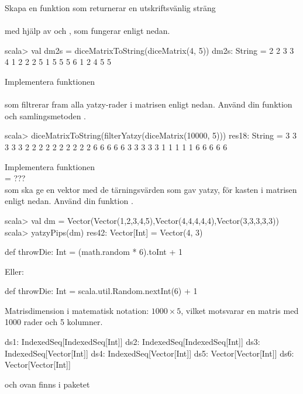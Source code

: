 \Subtask \label{matrices:subtask:diceMatrixToString} Skapa en funktion som returnerar en utskriftsvänlig sträng \\  \\med hjälp av  och , som fungerar enligt nedan.
\begin{REPL}
scala> val dm2s = diceMatrixToString(diceMatrix(4, 5))
dm2s: String =
2 2 3 3 4
1 2 2 2 5
1 5 5 5 6
1 2 4 5 5
\end{REPL}



\Subtask Implementera funktionen \\  \\ som filtrerar fram alla yatzy-rader i matrisen  enligt nedan. Använd din funktion  och samlingsmetoden .
\begin{REPL}
scala> diceMatrixToString(filterYatzy(diceMatrix(10000, 5)))
res18: String =
3 3 3 3 3
2 2 2 2 2
2 2 2 2 2
6 6 6 6 6
3 3 3 3 3
1 1 1 1 1
6 6 6 6 6
\end{REPL}



\Subtask Implementera funktionen \\
 = ???\\
som ska ge en vektor med de tärningsvärden som gav yatzy, för kasten i matrisen  enligt nedan. Använd din funktion .
\begin{REPL}
scala> val dm = Vector(Vector(1,2,3,4,5),Vector(4,4,4,4,4),Vector(3,3,3,3,3))
scala> yatzyPips(dm)
res42: Vector[Int] = Vector(4, 3)
\end{REPL}

\SOLUTION

\TaskSolved \what

\SubtaskSolved
\begin{Code}
def throwDie: Int = (math.random * 6).toInt + 1
\end{Code}
Eller:
\begin{Code}
def throwDie: Int = scala.util.Random.nextInt(6) + 1
\end{Code}

\SubtaskSolved  Matrisdimension i matematisk notation: $1000 \times 5$, vilket motsvarar en matris med 1000 rader och 5 kolumner.

\SubtaskSolved
\begin{Code}
ds1: IndexedSeq[IndexedSeq[Int]]
ds2: IndexedSeq[IndexedSeq[Int]]
ds3: IndexedSeq[Vector[Int]]
ds4: IndexedSeq[Vector[Int]]
ds5: Vector[Vector[Int]]
ds6: Vector[Vector[Int]]
\end{Code}
 och  ovan finns i paketet 

